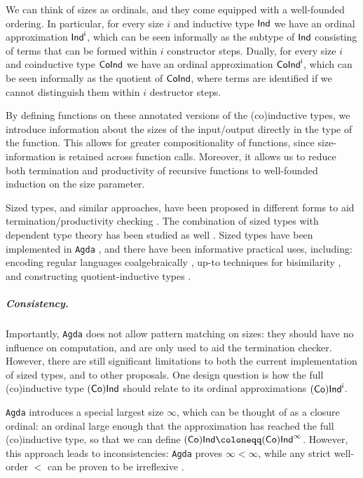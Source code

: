 We can think of sizes as ordinals, and they come equipped with a well-founded ordering.
In particular, for every size \(i\) and inductive type \(\sf{Ind}\) we have an ordinal approximation \(\sf{Ind}^i\), which can be seen informally as the subtype of \(\sf{Ind}\) consisting of terms that can be formed within \(i\) constructor steps.
Dually, for every size \(i\) and coinductive type \(\sf{CoInd}\) we have an ordinal approximation \(\sf{CoInd}^i\), which can be seen informally as the quotient of \(\sf{CoInd}\), where terms are identified if we cannot distinguish them within \(i\) destructor steps.

By defining functions on these annotated versions of the (co)inductive types, we introduce information about the sizes of the input/output directly in the type of the function.
This allows for greater compositionality of functions, since size-information is retained across function calls.
Moreover, it allows us to reduce both termination and productivity of recursive functions to well-founded induction on the size parameter.

Sized types, and similar approaches, have been proposed in different forms to aid  termination/productivity checking \cite{xi_sizes_2002, blanqui_sizes_2004, barthe_sizes_2004, Abel2006TypebasedTA, abel_2008}. 
The combination of sized types with dependent type theory has been studied as well \cite{Barthe, sacchini_2013, sacchini_2014, NbE, Chan_2022}.
Sized types have been implemented in \texttt{Agda} \cite{PAR-10:MiniAgda_Integrating_Sized_Dependent}, and there have been informative practical uses, including: encoding regular languages coalgebraically \cite{abel_2016}, up-to techniques for bisimilarity \cite{up-to-sized-types}, and constructing quotient-inductive types \cite{constructing-qits}.

\subparagraph*{Consistency.}
Importantly, \texttt{Agda} does not allow pattern matching on sizes: they should have no influence on computation, and are only used to aid the termination checker.
However, there are still significant limitations to both the current implementation of sized types, and to other proposals.
One design question is how the full (co)inductive type \((\sf{Co})\sf{Ind}\) should relate to its ordinal approximations \((\sf{Co})\sf{Ind}^i\).

\texttt{Agda} introduces a special largest size $\infty$, which can be thought of as a closure ordinal: an ordinal large enough that the approximation has reached the full (co)inductive type, so that we can define \((\sf{Co})\sf{Ind}\coloneqq (\sf{Co})\sf{Ind}^\infty\).
However, this approach leads to inconsistencies: \texttt{Agda} proves \(\infty<\infty\), while any strict well-order \(<\) can be proven to be irreflexive \cite{agda-issue-3026}.

